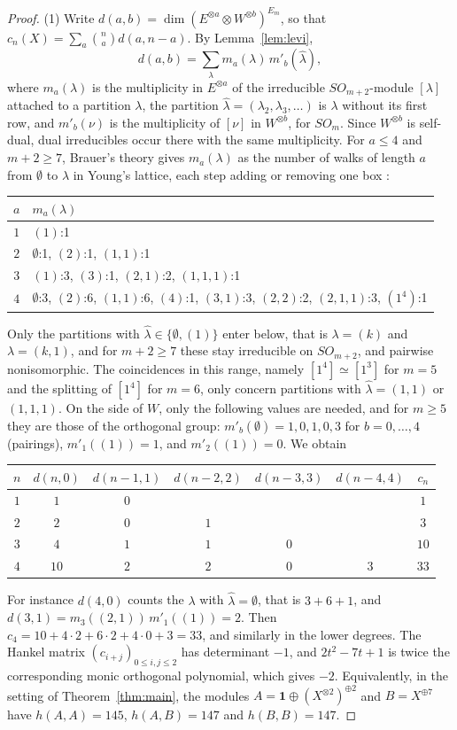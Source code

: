 \documentclass[11pt,reqno]{amsart}
\theoremstyle{definition}
\newcommand{\one}{\mathbf 1}
\begin{document}
\begin{proof}
(1) Write $d(a,b)=\dim(E^{\otimes a}\otimes W^{\otimes b})^{E_m}$, so that $c_n(X)=\sum_a\binom na d(a,n-a)$. By Lemma~\ref{lem:levi},
\[
   d(a,b)=\sum_\lambda m_a(\lambda)\,m'_b(\hat\lambda),
\]
where $m_a(\lambda)$ is the multiplicity in $E^{\otimes a}$ of the irreducible $SO_{m+2}$-module $[\lambda]$ attached to a partition $\lambda$, the partition $\hat\lambda=(\lambda_2,\lambda_3,\ldots)$ is $\lambda$ without its first row, and $m'_b(\nu)$ is the multiplicity of $[\nu]$ in $W^{\otimes b}$, for $SO_m$. Since $W^{\otimes b}$ is self-dual, dual irreducibles occur there with the same multiplicity. For $a\leq4$ and $m+2\geq7$, Brauer's theory gives $m_a(\lambda)$ as the number of walks of length $a$ from $\emptyset$ to $\lambda$ in Young's lattice, each step adding or removing one box \cite{Brauer,GW}:
\begin{center}\small
\begin{tabular}{@{}c|l@{}}
$a$ & $m_a(\lambda)$\\ \hline
$1$ & $(1)$:1\\
$2$ & $\emptyset$:1, $(2)$:1, $(1,1)$:1\\
$3$ & $(1)$:3, $(3)$:1, $(2,1)$:2, $(1,1,1)$:1\\
$4$ & $\emptyset$:3, $(2)$:6, $(1,1)$:6, $(4)$:1, $(3,1)$:3, $(2,2)$:2, $(2,1,1)$:3, $(1^4)$:1
\end{tabular}
\end{center}
Only the partitions with $\hat\lambda\in\{\emptyset,(1)\}$ enter below, that is $\lambda=(k)$ and $\lambda=(k,1)$, and for $m+2\geq7$ these stay irreducible on $SO_{m+2}$, and pairwise nonisomorphic. The coincidences in this range, namely $[1^4]\simeq[1^3]$ for $m=5$ and the splitting of $[1^4]$ for $m=6$, only concern partitions with $\hat\lambda=(1,1)$ or $(1,1,1)$. On the side of $W$, only the following values are needed, and for $m\geq5$ they are those of the orthogonal group: $m'_b(\emptyset)=1,0,1,0,3$ for $b=0,\ldots,4$ (pairings), $m'_1((1))=1$, and $m'_2((1))=0$. We obtain
\begin{center}\small
\begin{tabular}{@{}c|ccccc|c@{}}
$n$ & $d(n,0)$ & $d(n-1,1)$ & $d(n-2,2)$ & $d(n-3,3)$ & $d(n-4,4)$ & $c_n$\\ \hline
$1$ & $1$ & $0$ & & & & $1$\\
$2$ & $2$ & $0$ & $1$ & & & $3$\\
$3$ & $4$ & $1$ & $1$ & $0$ & & $10$\\
$4$ & $10$ & $2$ & $2$ & $0$ & $3$ & $33$
\end{tabular}
\end{center}
For instance $d(4,0)$ counts the $\lambda$ with $\hat\lambda=\emptyset$, that is $3+6+1$, and $d(3,1)=m_3((2,1))\,m'_1((1))=2$. Then $c_4=10+4\cdot2+6\cdot2+4\cdot0+3=33$, and similarly in the lower degrees. The Hankel matrix $(c_{i+j})_{0\leq i,j\leq2}$ has determinant $-1$, and $2t^2-7t+1$ is twice the corresponding monic orthogonal polynomial, which gives $-2$. Equivalently, in the setting of Theorem~\ref{thm:main}, the modules $A=\one\oplus(X^{\otimes2})^{\oplus2}$ and $B=X^{\oplus7}$ have $h(A,A)=145$, $h(A,B)=147$ and $h(B,B)=147$.


\end{proof}
\end{document}
